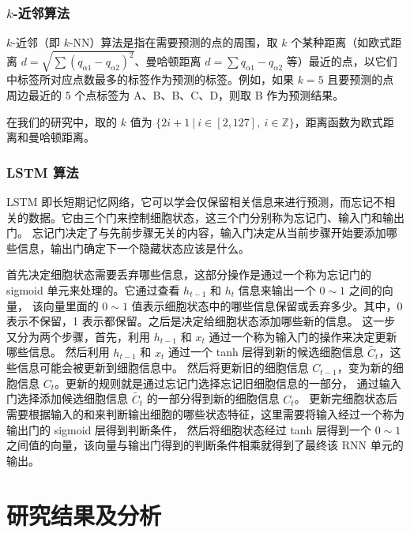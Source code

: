 \documentclass[a4paper,utf8,10pt]{article}
\begin{document}
\subsubsection{$k$-近邻算法}

$k$-近邻（即 $k$-NN）算法是指在需要预测的点的周围，取 $k$ 个某种距离（如欧式距离 $d = \sqrt{\sum (q_{\alpha 1}-q_{\alpha{2}})^2}$、曼哈顿距离 $d = \sum q_{\alpha 1}-q_{\alpha{2}}$ 等）最近的点，以它们中标签所对应点数最多的标签作为预测的标签。例如，如果 $k = 5$ 且要预测的点周边最近的 5 个点标签为 A、B、B、C、D，则取 B 作为预测结果。

在我们的研究中，取的 $k$ 值为 $\{2i+1\: |\: i\in [2, 127],\: i \in \mathbb{Z} \}$，距离函数为欧式距离和曼哈顿距离。

\subsubsection{LSTM 算法}

LSTM 即长短期记忆网络，它可以学会仅保留相关信息来进行预测，而忘记不相关的数据。它由三个门来控制细胞状态，这三个门分别称为忘记门、输入门和输出门。
忘记门决定了与先前步骤无关的内容，输入门决定从当前步骤开始要添加哪些信息，输出门确定下一个隐藏状态应该是什么。

首先决定细胞状态需要丢弃哪些信息，这部分操作是通过一个称为忘记门的 sigmoid 单元来处理的。它通过查看 $h_{t-1}$ 和 $h_t$ 信息来输出一个 $0 \sim 1$ 之间的向量，
该向量里面的 $0 \sim 1$ 值表示细胞状态中的哪些信息保留或丢弃多少。其中，0 表示不保留，1 表示都保留。之后是决定给细胞状态添加哪些新的信息。
这一步又分为两个步骤，首先，利用 $h_{t-1}$ 和 $x_t$ 通过一个称为输入门的操作来决定更新哪些信息。
然后利用 $h_{t-1}$ 和 $x_t$ 通过一个 tanh 层得到新的候选细胞信息 $\tilde{C_t}$，这些信息可能会被更新到细胞信息中。
然后将更新旧的细胞信息 $C_{t-1}$，变为新的细胞信息 $C_t$。更新的规则就是通过忘记门选择忘记旧细胞信息的一部分，
通过输入门选择添加候选细胞信息 $\tilde{C_t}$ 的一部分得到新的细胞信息 $C_t$。
更新完细胞状态后需要根据输入的和来判断输出细胞的哪些状态特征，这里需要将输入经过一个称为输出门的 sigmoid 层得到判断条件，
然后将细胞状态经过 tanh 层得到一个 $0 \sim 1$ 之间值的向量，该向量与输出门得到的判断条件相乘就得到了最终该 RNN 单元的输出。

\section{研究结果及分析}
\end{document}
